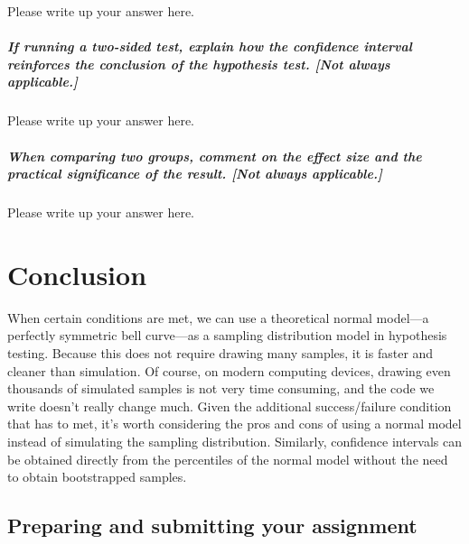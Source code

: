 \documentclass[
]{book}
\begin{document}
Please write up your answer here.

\hypertarget{if-running-a-two-sided-test-explain-how-the-confidence-interval-reinforces-the-conclusion-of-the-hypothesis-test.-not-always-applicable.}{%
\subparagraph*{If running a two-sided test, explain how the confidence interval reinforces the conclusion of the hypothesis test. {[}Not always applicable.{]}}\label{if-running-a-two-sided-test-explain-how-the-confidence-interval-reinforces-the-conclusion-of-the-hypothesis-test.-not-always-applicable.}}

Please write up your answer here.

\hypertarget{when-comparing-two-groups-comment-on-the-effect-size-and-the-practical-significance-of-the-result.-not-always-applicable.}{%
\subparagraph*{When comparing two groups, comment on the effect size and the practical significance of the result. {[}Not always applicable.{]}}\label{when-comparing-two-groups-comment-on-the-effect-size-and-the-practical-significance-of-the-result.-not-always-applicable.}}

Please write up your answer here.

\hypertarget{one-prop-conclusion}{%
\section{Conclusion}\label{one-prop-conclusion}}

When certain conditions are met, we can use a theoretical normal model---a perfectly symmetric bell curve---as a sampling distribution model in hypothesis testing. Because this does not require drawing many samples, it is faster and cleaner than simulation. Of course, on modern computing devices, drawing even thousands of simulated samples is not very time consuming, and the code we write doesn't really change much. Given the additional success/failure condition that has to met, it's worth considering the pros and cons of using a normal model instead of simulating the sampling distribution. Similarly, confidence intervals can be obtained directly from the percentiles of the normal model without the need to obtain bootstrapped samples.

\hypertarget{one-prop-prep}{%
\subsection{Preparing and submitting your assignment}\label{one-prop-prep}}
\end{document}
